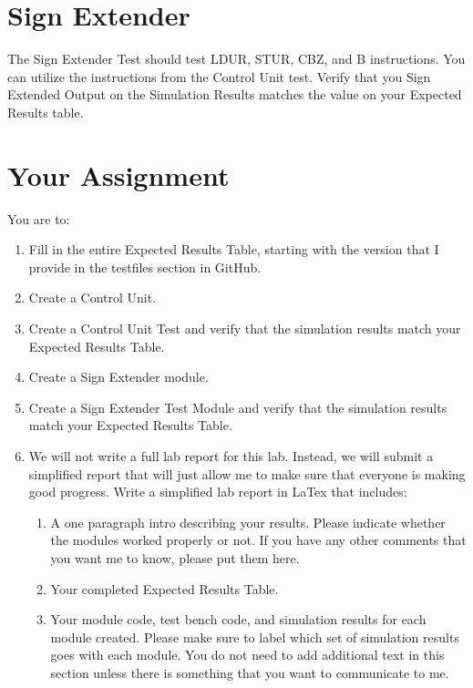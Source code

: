 \section{Sign Extender}
The Sign Extender Test should test LDUR, STUR, CBZ, and B instructions.  You can utilize the instructions from the Control Unit test.  Verify that you Sign Extended Output on the Simulation Results matches the value on your Expected Results table.

\clearpage
\section{Your Assignment}

You are to:
\begin{enumerate}
\item Fill in the entire Expected Results Table, starting with the version that I provide in the testfiles section in GitHub.
\item Create a Control Unit.
\item Create a Control Unit Test and verify that the simulation results match your Expected Results Table.
\item Create a Sign Extender module.
\item Create a Sign Extender Test Module and verify that the simulation results match your Expected Results Table.
\item We will not write a full lab report for this lab.  Instead, we will submit a simplified report that will just allow me to make sure that everyone is making good progress.  Write a simplified lab report in LaTex that includes:
\begin{enumerate}
	\item  A one paragraph intro describing your results.  Please indicate whether the modules worked properly or not.  If you have any other comments that you want me to know, please put them here.
	\item Your completed Expected Results Table.
	\item Your module code, test bench code, and simulation results for each module created.  Please make sure to label which set of simulation results goes with each module.  You do not need to add additional text in this section unless there is something that you want to communicate to me.
\end{enumerate} 
\end{enumerate} 
